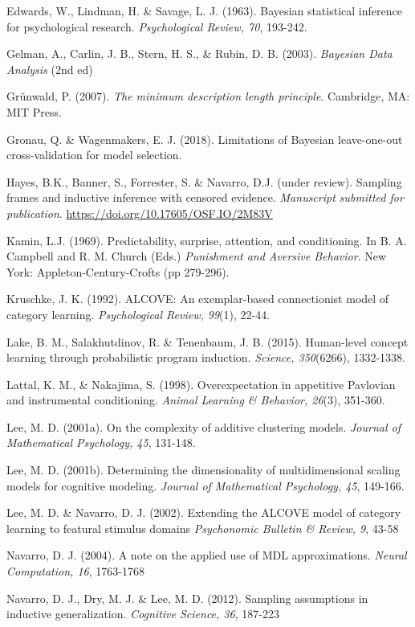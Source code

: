 \documentclass[doc]{apa6}
\theoremstyle{definition}
\theoremstyle{definition}
\theoremstyle{definition}
\theoremstyle{remark}
\begin{document}
Edwards, W., Lindman, H. \& Savage, L. J. (1963). Bayesian statistical
inference for psychological research. \emph{Psychological Review, 70},
193-242.

Gelman, A., Carlin, J. B., Stern, H. S., \& Rubin, D. B. (2003).
\emph{Bayesian Data Analysis} (2nd ed)

Grünwald, P. (2007). \emph{The minimum description length principle}.
Cambridge, MA: MIT Press.

Gronau, Q. \& Wagenmakers, E. J. (2018). Limitations of Bayesian
leave-one-out cross-validation for model selection.

Hayes, B.K., Banner, S., Forrester, S. \& Navarro, D.J. (under review).
Sampling frames and inductive inference with censored evidence.
\emph{Manuscript submitted for publication}.
\url{https://doi.org/10.17605/OSF.IO/2M83V}

Kamin, L.J. (1969). Predictability, surprise, attention, and
conditioning. In B. A. Campbell and R. M. Church (Eds.) \emph{Punishment
and Aversive Behavior}. New York: Appleton-Century-Crofts (pp 279-296).

Kruschke, J. K. (1992). ALCOVE: An exemplar-based connectionist model of
category learning. \emph{Psychological Review, 99}(1), 22-44.

Lake, B. M., Salakhutdinov, R. \& Tenenbaum, J. B. (2015). Human-level
concept learning through probabilistic program induction. \emph{Science,
350}(6266), 1332-1338.

Lattal, K. M., \& Nakajima, S. (1998). Overexpectation in appetitive
Pavlovian and instrumental conditioning. \emph{Animal Learning \&
Behavior, 26}(3), 351-360.

Lee, M. D. (2001a). On the complexity of additive clustering models.
\emph{Journal of Mathematical Psychology, 45}, 131-148.

Lee, M. D. (2001b). Determining the dimensionality of multidimensional
scaling models for cognitive modeling. \emph{Journal of Mathematical
Psychology, 45}, 149-166.

Lee, M. D. \& Navarro, D. J. (2002). Extending the ALCOVE model of
category learning to featural stimulus domains \emph{Psychonomic
Bulletin \& Review, 9}, 43-58

Navarro, D. J. (2004). A note on the applied use of MDL approximations.
\emph{Neural Computation, 16}, 1763-1768

Navarro, D. J., Dry, M. J. \& Lee, M. D. (2012). Sampling assumptions in
inductive generalization. \emph{Cognitive Science, 36}, 187-223
\end{document}
